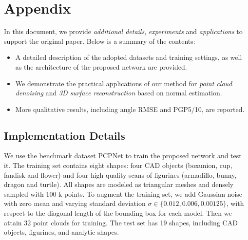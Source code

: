 \documentclass[runningheads]{llncs}
\begin{document}
\clearpage




\newpage
\appendix
\section{Appendix}

In this document, we provide \emph{additional details}, \emph{experiments} and \emph{applications} to support the original paper. Below is a summary of the contents:
\begin{itemize}
    \item A detailed description of the adopted datasets and training settings, as well as the architecture of the proposed network are provided.
    \item We demonstrate the practical applications of our method for \emph{point cloud denoising} and \emph{3D surface reconstruction} based on normal estimation.
    \item More qualitative results, including angle RMSE and PGP5/10, are reported.
\end{itemize}


\subsection{Implementation Details}
\label{sec:implement}
We use the benchmark dataset PCPNet \cite{guerrero2018pcpnet} to train the proposed network and test it. The training set contains eight shapes: four CAD objects (boxunion, cup, fandisk and flower) and four high-quality scans of figurines (armadillo, bunny, dragon and turtle). All shapes are modeled as triangular meshes and densely sampled with 100 k points. To augment the training set, we add Gaussian noise with zero mean and varying standard deviation $\sigma\in \{0.012, 0.006, 0.00125\}$, with respect to the diagonal length of the bounding box for each model. Then we attain 32 point clouds for training. The test set has 19 shapes, including CAD objects, figurines, and analytic shapes.
\end{document}
